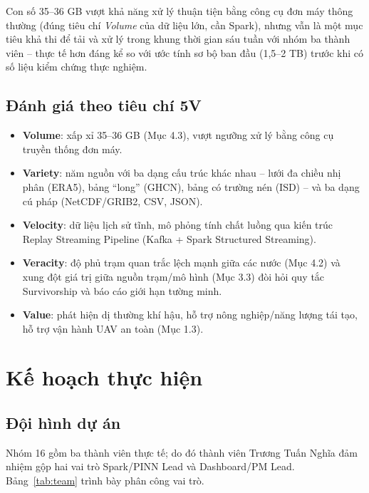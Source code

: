 \documentclass[12pt,a4paper]{report}
\begin{document}
Con số 35--36 GB vượt khả năng xử lý thuận tiện bằng công cụ đơn máy thông thường (đúng tiêu chí \emph{Volume} của dữ liệu lớn, cần Spark), nhưng vẫn là một mục tiêu khả thi để tải và xử lý trong khung thời gian sáu tuần với nhóm ba thành viên -- thực tế hơn đáng kể so với ước tính sơ bộ ban đầu (1,5--2 TB) trước khi có số liệu kiểm chứng thực nghiệm.

\section{Đánh giá theo tiêu chí 5V}

\begin{itemize}
    \item \textbf{Volume}: xấp xỉ 35--36 GB (Mục 4.3), vượt ngưỡng xử lý bằng công cụ truyền thống đơn máy.
    \item \textbf{Variety}: năm nguồn với ba dạng cấu trúc khác nhau -- lưới đa chiều nhị phân (ERA5), bảng ``long'' (GHCN), bảng có trường nén (ISD) -- và ba dạng cú pháp (NetCDF/GRIB2, CSV, JSON).
    \item \textbf{Velocity}: dữ liệu lịch sử tĩnh, mô phỏng tính chất luồng qua kiến trúc Replay Streaming Pipeline (Kafka + Spark Structured Streaming).
    \item \textbf{Veracity}: độ phủ trạm quan trắc lệch mạnh giữa các nước (Mục 4.2) và xung đột giá trị giữa nguồn trạm/mô hình (Mục 3.3) đòi hỏi quy tắc Survivorship và báo cáo giới hạn tường minh.
    \item \textbf{Value}: phát hiện dị thường khí hậu, hỗ trợ nông nghiệp/năng lượng tái tạo, hỗ trợ vận hành UAV an toàn (Mục 1.3).
\end{itemize}

\chapter{Kế hoạch thực hiện}

\section{Đội hình dự án}

Nhóm 16 gồm ba thành viên thực tế; do đó thành viên Trương Tuấn Nghĩa đảm nhiệm gộp hai vai trò Spark/PINN Lead và Dashboard/PM Lead. Bảng~\ref{tab:team} trình bày phân công vai trò.
\end{document}

